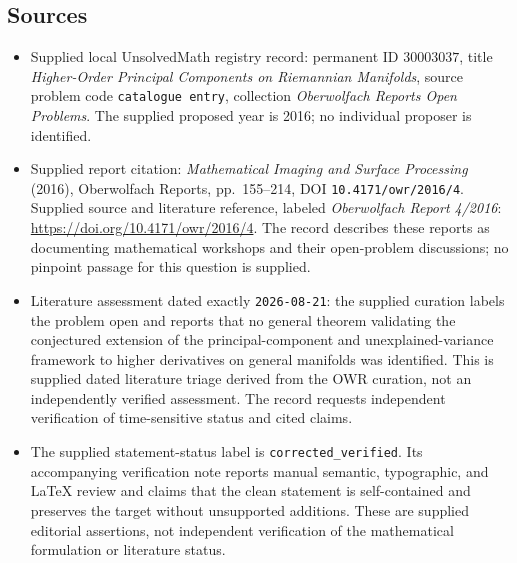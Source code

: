 \documentclass[11pt]{article}
\begin{document}
\subsection{Sources}
\begin{itemize}
\item Supplied local UnsolvedMath registry record: permanent ID \(30003037\), title \emph{Higher-Order Principal Components on Riemannian Manifolds}, source problem code \texttt{catalogue entry}, collection \emph{Oberwolfach Reports Open Problems}. The supplied proposed year is 2016; no individual proposer is identified.
\item Supplied report citation: \emph{Mathematical Imaging and Surface Processing} (2016), Oberwolfach Reports, pp.~155--214, DOI \texttt{10.4171/owr/2016/4}. Supplied source and literature reference, labeled \emph{Oberwolfach Report 4/2016}: \url{https://doi.org/10.4171/owr/2016/4}. The record describes these reports as documenting mathematical workshops and their open-problem discussions; no pinpoint passage for this question is supplied.
\item Literature assessment dated exactly \texttt{2026-08-21}: the supplied curation labels the problem open and reports that no general theorem validating the conjectured extension of the principal-component and unexplained-variance framework to higher derivatives on general manifolds was identified. This is supplied dated literature triage derived from the OWR curation, not an independently verified assessment. The record requests independent verification of time-sensitive status and cited claims.
\item The supplied statement-status label is \texttt{corrected\_verified}. Its accompanying verification note reports manual semantic, typographic, and LaTeX review and claims that the clean statement is self-contained and preserves the target without unsupported additions. These are supplied editorial assertions, not independent verification of the mathematical formulation or literature status.
\end{itemize}
\end{document}
